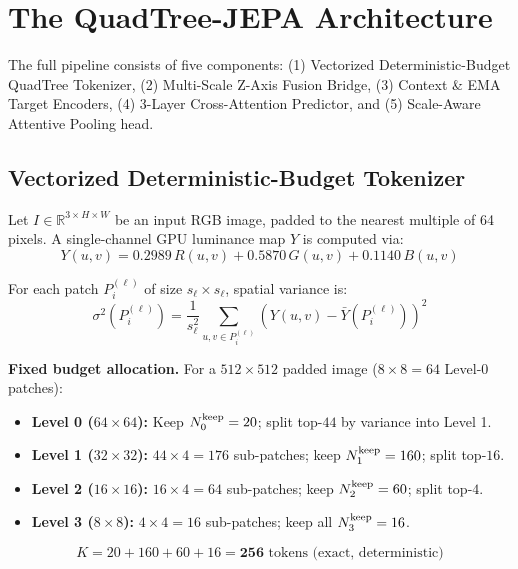 \documentclass[10pt,twocolumn,letterpaper]{article}
\begin{document}
\section{The QuadTree-JEPA Architecture}
\label{sec:method}

The full pipeline consists of five components: (1) Vectorized Deterministic-Budget QuadTree Tokenizer, (2) Multi-Scale Z-Axis Fusion Bridge, (3) Context \& EMA Target Encoders, (4) 3-Layer Cross-Attention Predictor, and (5) Scale-Aware Attentive Pooling head.

\subsection{Vectorized Deterministic-Budget Tokenizer}
\label{sec:tokenizer}

Let $I \in \mathbb{R}^{3 \times H \times W}$ be an input RGB image, padded to the nearest multiple of 64 pixels. A single-channel GPU luminance map $Y$ is computed via:
\begin{equation}
Y(u,v) = 0.2989\, R(u,v) + 0.5870\, G(u,v) + 0.1140\, B(u,v)
\end{equation}

For each patch $P_i^{(\ell)}$ of size $s_\ell \!\times\! s_\ell$, spatial variance is:
\begin{equation}
\sigma^2(P_i^{(\ell)}) = \frac{1}{s_\ell^2} \!\sum_{u,v \in P_i^{(\ell)}} \!\!\left( Y(u,v) - \bar{Y}(P_i^{(\ell)}) \right)^{\!2}
\end{equation}

\textbf{Fixed budget allocation.} For a $512\!\times\!512$ padded image ($8\!\times\!8 = 64$ Level-0 patches):
\begin{itemize}
    \item \textbf{Level 0 ($64\!\times\!64$):} Keep $N_0^{\rm keep}=20$; split top-$44$ by variance into Level 1.
    \item \textbf{Level 1 ($32\!\times\!32$):} $44\!\times\!4=176$ sub-patches; keep $N_1^{\rm keep}=160$; split top-$16$.
    \item \textbf{Level 2 ($16\!\times\!16$):} $16\!\times\!4=64$ sub-patches; keep $N_2^{\rm keep}=60$; split top-$4$.
    \item \textbf{Level 3 ($8\!\times\!8$):} $4\!\times\!4=16$ sub-patches; keep all $N_3^{\rm keep}=16$.
\end{itemize}
\begin{equation}
K = 20 + 160 + 60 + 16 = \mathbf{256} \text{ tokens (exact, deterministic)}
\end{equation}
\end{document}

